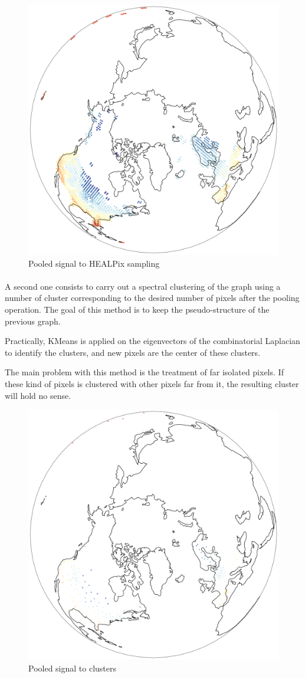 \documentclass[11pt]{report}
\begin{document}
\begin{figure}[!ht]
    \centering
    \includegraphics[width=0.6\linewidth]{figures/healpix_pool_signal.png}
    \caption{Pooled signal to HEALPix sampling}
    \label{fig:pool_healpix}
\end{figure}
\clearpage
\paragraph*{}
A second one consists to carry out a spectral clustering of the graph using a number of cluster corresponding to the desired number of pixels after the pooling operation. The goal of this method is to keep the pseudo-structure of the previous graph.

Practically, KMeans is applied on the eigenvectors of the combinatorial Laplacian to identify the clusters, and new pixels are the center of these clusters.

The main problem with this method is the treatment of far isolated pixels. If these kind of pixels is clustered with other pixels far from it, the resulting cluster will hold no sense.

\begin{figure}[!ht]
    \centering
    \includegraphics[width=0.6\linewidth]{figures/cluster_pool_signal.png}
    \caption{Pooled signal to clusters}
    \label{fig:pool_cluster}
\end{figure}
\end{document}
